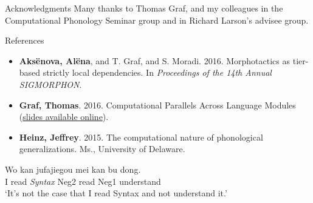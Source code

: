 \documentclass[professionalfonts, xcolor={usenames,svgnames,x11names,table}]{beamer}
\begin{document}
\begin{frame}{Acknowledgments}
Many thanks to Thomas Graf, and my colleagues in the Computational Phonology Seminar group and in Richard Larson's advisee group. 
\end{frame}


\begin{frame}{References}
\begin{itemize}
\item \textbf{Aks\"{e}nova, Al\"{e}na}, and T. Graf, and S. Moradi. 2016. Morphotactics as tier-based strictly local dependencies. In \textit{Proceedings of the 14th Annual SIGMORPHON}.
\item \textbf{Graf, Thomas}. 2016. Computational Parallels Across Language Modules (\href{http://thomasgraf.net/doc/talks/Graf16Yaletalk.pdf}{slides available online}).
\item \textbf{Heinz, Jeffrey}. 2015. The computational nature of phonological generalizations. Ms., University of Delaware.
\end{itemize}  
\end{frame}

\begin{frame}
\end{frame}

\begin{frame}
\begin{exe}
\ex \gll Wo  kan   jufajiegou  mei  kan  bu  dong. \\
                 I  read  \textit{Syntax}  Neg2  read  Neg1  understand \\
                \glt `It's not the case that I read Syntax and not understand it.'
\end{exe}
\end{frame}
\end{document}
